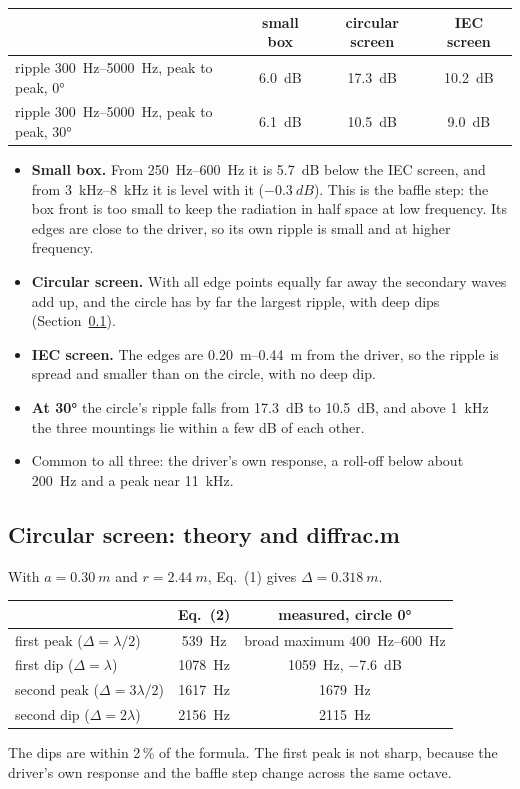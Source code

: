\documentclass[a4paper,10pt]{article}
\begin{document}
\begin{center}\small
\begin{tabular}{lccc}
\toprule
 & small box & circular screen & IEC screen \\
\midrule
ripple \SIrange{300}{5000}{Hz}, peak to peak, 0° & \SI{6.0}{dB} & \SI{17.3}{dB} & \SI{10.2}{dB} \\
ripple \SIrange{300}{5000}{Hz}, peak to peak, 30° & \SI{6.1}{dB} & \SI{10.5}{dB} & \SI{9.0}{dB} \\
\bottomrule
\end{tabular}
\end{center}
\begin{itemize}
\item \textbf{Small box.} From \SIrange{250}{600}{Hz} it is \SI{5.7}{dB} below the IEC screen, and from
  \SIrange{3}{8}{kHz} it is level with it ($\SI{-0.3}{dB}$). This is the baffle step: the box front is
  too small to keep the radiation in half space at low frequency. Its edges are close to the
  driver, so its own ripple is small and at higher frequency.
\item \textbf{Circular screen.} With all edge points equally far away the secondary waves add up,
  and the circle has by far the largest ripple, with deep dips (Section~\ref{sec:circle}).
\item \textbf{IEC screen.} The edges are \SIrange{0.20}{0.44}{m} from the driver, so the ripple is
  spread and smaller than on the circle, with no deep dip.
\item \textbf{At 30°} the circle's ripple falls from \SI{17.3}{dB} to \SI{10.5}{dB}, and above
  \SI{1}{kHz} the three mountings lie within a few dB of each other.
\item Common to all three: the driver's own response, a roll-off below about \SI{200}{Hz} and a peak near
  \SI{11}{kHz}.
\end{itemize}

\subsection{Circular screen: theory and diffrac.m}\label{sec:circle}
With $a=\SI{0.30}{m}$ and $r=\SI{2.44}{m}$, Eq.~(1) gives $\Delta=\SI{0.318}{m}$.
\begin{center}\small
\begin{tabular}{lcc}
\toprule
 & Eq.~(2) & measured, circle 0° \\
\midrule
first peak ($\Delta=\lambda/2$) & \SI{539}{Hz} & broad maximum \SIrange{400}{600}{Hz} \\
first dip ($\Delta=\lambda$) & \SI{1078}{Hz} & \SI{1059}{Hz}, \SI{-7.6}{dB} \\
second peak ($\Delta=3\lambda/2$) & \SI{1617}{Hz} & \SI{1679}{Hz} \\
second dip ($\Delta=2\lambda$) & \SI{2156}{Hz} & \SI{2115}{Hz} \\
\bottomrule
\end{tabular}
\end{center}
The dips are within 2\,\% of the formula. The first peak is not sharp, because the driver's own
response and the baffle step change across the same octave.
\end{document}
